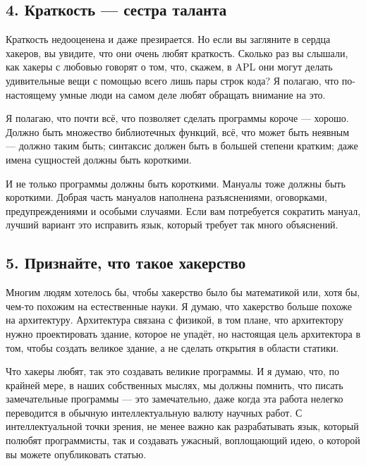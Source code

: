 \documentclass[ebook,12pt,oneside,openany]{memoir}
\begin{document}
\subsection{4. Краткость — сестра таланта}

Краткость недооценена и даже презирается. Но если вы загляните в
сердца хакеров, вы увидите, что они очень любят краткость. Сколько раз
вы слышали, как хакеры с любовью говорят о том, что, скажем, в APL они
могут делать удивительные вещи с помощью всего лишь пары строк кода? Я
полагаю, что по-настоящему умные люди на самом деле любят обращать
внимание на это. \newline

Я полагаю, что почти всё, что позволяет сделать программы короче —
хорошо. Должно быть множество библиотечных функций, всё, что может
быть неявным — должно таким быть; синтаксис должен быть в большей
степени кратким; даже имена сущностей должны быть короткими. \newline

И не только программы должны быть короткими. Мануалы тоже должны быть
короткими. Добрая часть мануалов наполнена разъяснениями, оговорками,
предупреждениями и особыми случаями. Если вам потребуется сократить
мануал, лучший вариант это исправить язык, который требует так много
объяснений. \newline

\subsection{5. Признайте, что такое хакерство}

Многим людям хотелось бы, чтобы хакерство было бы математикой или,
хотя бы, чем-то похожим на естественные науки. Я думаю, что хакерство
больше похоже на архитектуру. Архитектура связана с физикой, в том
плане, что архитектору нужно проектировать здание, которое не упадёт,
но настоящая цель архитектора в том, чтобы создать великое здание, а
не сделать открытия в области статики. \newline

Что хакеры любят, так это создавать великие программы. И я думаю, что,
по крайней мере, в наших собственных мыслях, мы должны помнить, что
писать замечательные программы — это замечательно, даже когда эта
работа нелегко переводится в обычную интеллектуальную валюту научных
работ. С интеллектуальной точки зрения, не менее важно как
разрабатывать язык, который полюбят программисты, так и создавать
ужасный, воплощающий идею, о которой вы можете опубликовать статью. \newline
\end{document}
